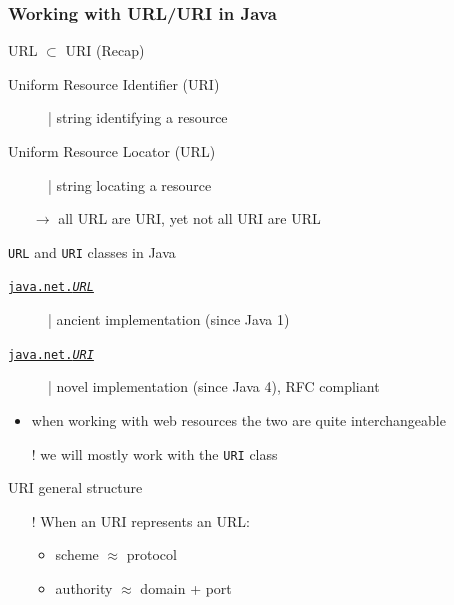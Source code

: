\documentclass[presentation]{beamer}\mode<presentation>{\usetheme{AMSCesenaPurpleAndGold}}
\begin{document}
\begin{frame}[allowframebreaks]
    \frametitle{Working with URL/URI in Java}

    \begin{block}{URL $\subset$ URI (Recap)}
        \begin{description}
            \item[Uniform Resource Identifier (URI)] | string \alert{identifying} a resource
            \item[Uniform Resource Locator (URL)] | string \alert{locating} a resource
        \end{description}
        \begin{itemize}
            \item[$\rightarrow$] all URL are URI, yet not all URI are URL
        \end{itemize}
    \end{block}

    \begin{block}{\texttt{URL} and \texttt{URI} classes in Java}
        \begin{description}
            \item[\href{https://docs.oracle.com/en/java/javase/15/docs/api/java.base/java/net/URL.html}{\texttt{java.net.\textit{URL}}}] | ancient implementation (since Java 1)
            \item[\href{https://docs.oracle.com/en/java/javase/15/docs/api/java.base/java/net/URI.html}{\texttt{java.net.\textit{URI}}}] | novel implementation (since Java 4), RFC compliant
        \end{description}
        \begin{itemize}
            \item when working with web resources the two are quite interchangeable
            \item[!] we will mostly work with the \texttt{URI} class
        \end{itemize}
    \end{block}

    \begin{block}{URI general structure}
        \begin{center}\ttfamily
            [scheme:][//authority][path][?query][\#fragment]
        \end{center}

        \begin{itemize}
            \item[!] When an URI represents an URL:
            \begin{itemize}
                \item scheme $\approx$ protocol
                \item authority $\approx$ domain + port
            \end{itemize}
        \end{itemize}
    \end{block}


\end{frame}
\end{document}
